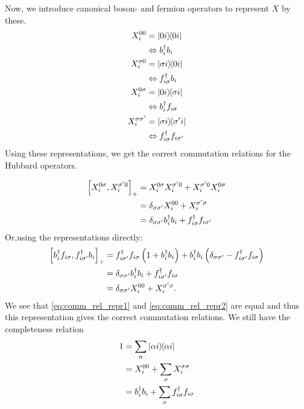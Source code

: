 Now, we introduce canonical boson-  and fermion operators to represent $X$ by these.
\begin{align*}
X_i^{00} &= \dyad{0i} \\
&\Leftrightarrow b_i^\dagger b_i\\
X_i^{\sigma 0} &= \dyad{\sigma i}{0i} \\
&\Leftrightarrow f_{i\sigma}^\dagger b_i \\
X_i^{0\sigma} &= \dyad{0i}{\sigma i} \\
&\Leftrightarrow b_i^\dagger f_{i\sigma}\\
X_i^{\sigma\sigma'} &= \dyad{\sigma i}{\sigma' i}\\
&\Leftrightarrow f_{i\sigma}^\dagger f_{i\sigma'}
\end{align*}
Using these representations, we get the correct commutation relations for the Hubbard operators. 

\begin{align}
\label{eq:comm_rel_repr1}
\begin{split}
\comm{X_i^{0\sigma}}{X_i^{\sigma'0}}_+ &= X_i^{0\sigma}X_i^{\sigma'0} +X_i^{\sigma'0}X_i^{0\sigma}\\
&= \delta_{\sigma\sigma'}X_i^{00} + X_i^{\sigma'\sigma} \\
&= \delta_{\sigma\sigma'}b_i^\dagger b_i + f_{i\sigma}^\dagger f_{i\sigma'}
\end{split}
\end{align}
Or,using the representations directly:
\begin{align}
\label{eq:comm_rel_repr2}
\begin{split}
\comm{b_i^\dagger f_{i\sigma}}{f_{i\sigma'}^\dagger b_i}_+ &= f_{i\sigma'}^\dagger f_{i\sigma}\left(1+b_i^\dagger b_i\right) + b_i^\dagger b_i \left(\delta_{\sigma\sigma'} - f_{i\sigma'}^\dagger f_{i\sigma}\right) \\
&= \delta_{\sigma\sigma'}b_i^\dagger b_i + f_{i\sigma'}^\dagger f_{i\sigma} \\
&= \delta_{\sigma\sigma'}X_i^{00} + X_i^{\sigma'\sigma}.
\end{split}
\end{align}
We see that \eqref{eq:comm_rel_repr1} and \eqref{eq:comm_rel_repr2} are equal and thus this representation gives the correct commutation relations. We still have the completeness relation
\begin{align}
\begin{split}
1 &= \sum_\alpha \dyad{\alpha i} \\
&= X_i^{00} + \sum_\sigma X_i^{\sigma\sigma}\\
&= b_i^\dagger b_i + \sum_\sigma f_{i\sigma}^\dagger f_{i\sigma}
\end{split}
\end{align}

